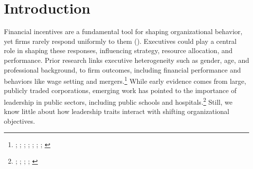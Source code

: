 \documentclass[12pt]{article}
\theoremstyle{definition}   %
\begin{document}
\begin{abstract}
{         %
		} 
	\end{abstract}
	
	
	
	
	

	
	\onehalfspacing
	
	\newpage

    \section{Introduction}

    Financial incentives are a fundamental tool for shaping organizational behavior, yet firms rarely respond uniformly to them (\cite{cala2022financial}). Executives could play a central role in shaping these responses, influencing strategy, resource allocation, and performance. Prior research links executive heterogeneity such as gender, age, and professional background, to firm outcomes, including financial performance and behaviors like wage setting and mergers.\footnote{\cite{bertrand2003managing}; \cite{matsa2011chipping}; \cite{adams2009women}; \cite{ahern2012changing}; \cite{flabbi2019female}; \cite{benmelech2015military}; \cite{custodio2013generalists}; \cite{frydman2019rising}} While early evidence comes from large, publicly traded corporations, emerging work has pointed to the importance of leadership in public sectors, including public schools and hospitals.\footnote{\cite{best2023individuals}; \cite{bertrand2020glittering}; \cite{choudhury2020managers}; \cite{fenizia2022managers}; \cite{lavy2023effects}} Still, we know little about how leadership traits interact with shifting organizational objectives.
\end{document}
